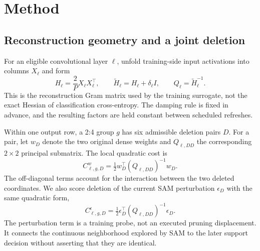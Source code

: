 \documentclass[10pt,a4paper]{article}
\begin{document}
\section{Method}
\subsection{Reconstruction geometry and a joint deletion}
For an eligible convolutional layer $\ell$, unfold training-side input activations into columns $X_\ell$ and form
\begin{equation}
H_\ell=\frac{2}{P}X_\ell X_\ell^{\top},\qquad
\widetilde H_\ell=H_\ell+\delta_\ell I,\qquad
Q_\ell=\widetilde H_\ell^{-1}.
\label{eq:gram}
\end{equation}
This is the reconstruction Gram matrix used by the training surrogate, not the exact Hessian of classification cross-entropy. The damping rule is fixed in advance, and the resulting factors are held constant between scheduled refreshes.

Within one output row, a 2:4 group $g$ has six admissible deletion pairs $D$. For a pair, let $w_D$ denote the two original dense weights and $Q_{\ell,DD}$ the corresponding $2\times2$ principal submatrix. The local quadratic cost is
\begin{equation}
C^{w}_{\ell,g,D}=\tfrac12w_D^{\top}(Q_{\ell,DD})^{-1}w_D.
\label{eq:weightcost}
\end{equation}
The off-diagonal terms account for the interaction between the two deleted coordinates. We also score deletion of the current SAM perturbation $\epsilon_D$ with the same quadratic form,
\begin{equation}
C^{\epsilon}_{\ell,g,D}=\tfrac12\epsilon_D^{\top}(Q_{\ell,DD})^{-1}\epsilon_D.
\label{eq:probecost}
\end{equation}
The perturbation term is a training probe, not an executed pruning displacement. It connects the continuous neighborhood explored by SAM to the later support decision without asserting that they are identical.
\end{document}
